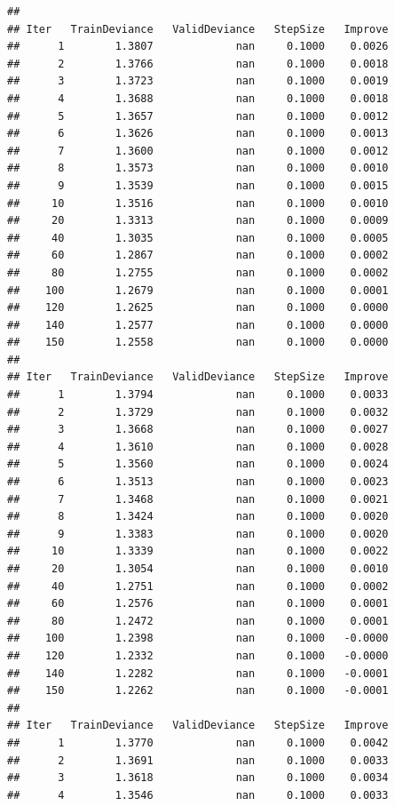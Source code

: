 \documentclass[]{article}
\begin{document}
\begin{verbatim}
## 
## Iter   TrainDeviance   ValidDeviance   StepSize   Improve
##      1        1.3807             nan     0.1000    0.0026
##      2        1.3766             nan     0.1000    0.0018
##      3        1.3723             nan     0.1000    0.0019
##      4        1.3688             nan     0.1000    0.0018
##      5        1.3657             nan     0.1000    0.0012
##      6        1.3626             nan     0.1000    0.0013
##      7        1.3600             nan     0.1000    0.0012
##      8        1.3573             nan     0.1000    0.0010
##      9        1.3539             nan     0.1000    0.0015
##     10        1.3516             nan     0.1000    0.0010
##     20        1.3313             nan     0.1000    0.0009
##     40        1.3035             nan     0.1000    0.0005
##     60        1.2867             nan     0.1000    0.0002
##     80        1.2755             nan     0.1000    0.0002
##    100        1.2679             nan     0.1000    0.0001
##    120        1.2625             nan     0.1000    0.0000
##    140        1.2577             nan     0.1000    0.0000
##    150        1.2558             nan     0.1000    0.0000
## 
## Iter   TrainDeviance   ValidDeviance   StepSize   Improve
##      1        1.3794             nan     0.1000    0.0033
##      2        1.3729             nan     0.1000    0.0032
##      3        1.3668             nan     0.1000    0.0027
##      4        1.3610             nan     0.1000    0.0028
##      5        1.3560             nan     0.1000    0.0024
##      6        1.3513             nan     0.1000    0.0023
##      7        1.3468             nan     0.1000    0.0021
##      8        1.3424             nan     0.1000    0.0020
##      9        1.3383             nan     0.1000    0.0020
##     10        1.3339             nan     0.1000    0.0022
##     20        1.3054             nan     0.1000    0.0010
##     40        1.2751             nan     0.1000    0.0002
##     60        1.2576             nan     0.1000    0.0001
##     80        1.2472             nan     0.1000    0.0001
##    100        1.2398             nan     0.1000   -0.0000
##    120        1.2332             nan     0.1000   -0.0000
##    140        1.2282             nan     0.1000   -0.0001
##    150        1.2262             nan     0.1000   -0.0001
## 
## Iter   TrainDeviance   ValidDeviance   StepSize   Improve
##      1        1.3770             nan     0.1000    0.0042
##      2        1.3691             nan     0.1000    0.0033
##      3        1.3618             nan     0.1000    0.0034
##      4        1.3546             nan     0.1000    0.0033

\end{verbatim}
\end{document}
